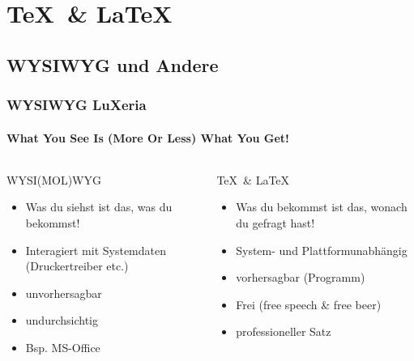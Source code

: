 \section{\TeX~\& \LaTeX}
\begin{frame}
    \frametitle{}
\end{frame}

\subsection{WYSIWYG und Andere}
\begin{frame}
	\frametitle{WYSIWYG \hfill{} \footnotesize{LuXeria}}
    \framesubtitle{What You See Is (More Or Less) What You Get!}
    \begin{columns}
        \begin{column}{5cm}
            \begin{alertblock}{WYSI(MOL)WYG}
                \begin{itemize}
                    \item Was du siehst ist das, was du bekommst!
                    \item Interagiert mit Systemdaten (Druckertreiber etc.)
                    \item unvorhersagbar
                    \item undurchsichtig
                    \item Bsp. MS-Office
                \end{itemize}
            \end{alertblock}
        \end{column}
        \begin{column}{5cm}
            \begin{exampleblock}{\TeX~\& \LaTeX}
                \begin{itemize}
                    \item Was du bekommst ist das, wonach du gefragt hast!
                    \item System- und Plattformunabhängig
                    \item vorhersagbar (Programm)
                    \item Frei (free speech \& free beer)
                    \item professioneller Satz
                \end{itemize}
            \end{exampleblock}
        \end{column}
    \end{columns}
\end{frame}

